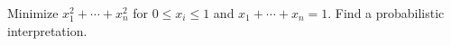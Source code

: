 Minimize $x_1^2 + \cdots + x_n^2$ for $0 \leq x_i \leq 1$ and $x_1 + \cdots + x_n = 1$. Find a probabilistic interpretation.
